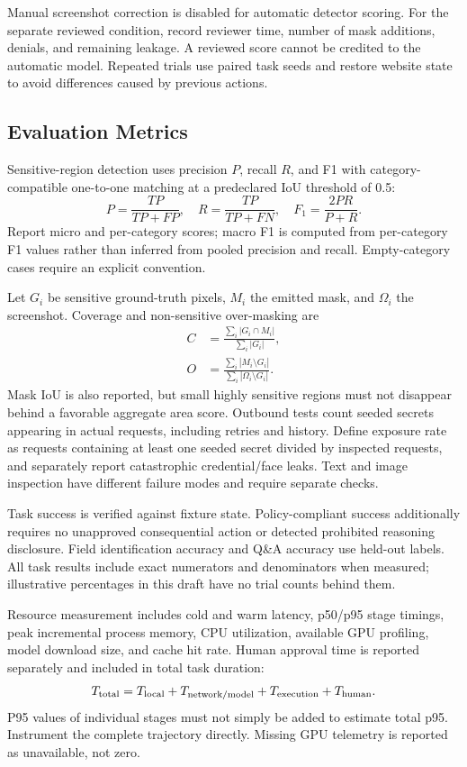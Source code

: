 \documentclass[conference]{IEEEtran}
\begin{document}
Manual screenshot correction is disabled for automatic detector scoring. For the separate reviewed condition, record reviewer time, number of mask additions, denials, and remaining leakage. A reviewed score cannot be credited to the automatic model. Repeated trials use paired task seeds and restore website state to avoid differences caused by previous actions.

\subsection{Evaluation Metrics}
Sensitive-region detection uses precision $P$, recall $R$, and F1 with category-compatible one-to-one matching at a predeclared IoU threshold of 0.5:
\begin{equation}
 P=\frac{TP}{TP+FP},\quad R=\frac{TP}{TP+FN},\quad F_1=\frac{2PR}{P+R}.
\end{equation}
Report micro and per-category scores; macro F1 is computed from per-category F1 values rather than inferred from pooled precision and recall. Empty-category cases require an explicit convention.

Let $G_i$ be sensitive ground-truth pixels, $M_i$ the emitted mask, and $\Omega_i$ the screenshot. Coverage and non-sensitive over-masking are
\begin{align}
 C&=\frac{\sum_i|G_i\cap M_i|}{\sum_i|G_i|},\\
 O&=\frac{\sum_i|M_i\setminus G_i|}{\sum_i|\Omega_i\setminus G_i|}.
\end{align}
Mask IoU is also reported, but small highly sensitive regions must not disappear behind a favorable aggregate area score. Outbound tests count seeded secrets appearing in actual requests, including retries and history. Define exposure rate as requests containing at least one seeded secret divided by inspected requests, and separately report catastrophic credential/face leaks. Text and image inspection have different failure modes and require separate checks.

Task success is verified against fixture state. Policy-compliant success additionally requires no unapproved consequential action or detected prohibited reasoning disclosure. Field identification accuracy and Q\&A accuracy use held-out labels. All task results include exact numerators and denominators when measured; illustrative percentages in this draft have no trial counts behind them.

Resource measurement includes cold and warm latency, p50/p95 stage timings, peak incremental process memory, CPU utilization, available GPU profiling, model download size, and cache hit rate. Human approval time is reported separately and included in total task duration:
\begin{equation}
 T_{\rm total}=T_{\rm local}+T_{\rm network/model}+T_{\rm execution}+T_{\rm human}.
\end{equation}
P95 values of individual stages must not simply be added to estimate total p95. Instrument the complete trajectory directly. Missing GPU telemetry is reported as unavailable, not zero.
\end{document}
